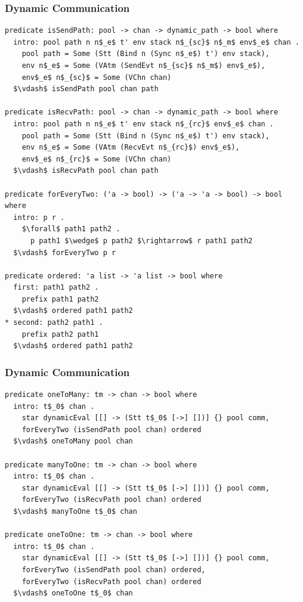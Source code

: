 \documentclass{beamer}
\begin{document}
\begin{frame}[fragile]
	\frametitle{Dynamic Communication}
\begin{lstlisting}[language=logic, mathescape]
predicate isSendPath: pool -> chan -> dynamic_path -> bool where
  intro: pool path n n$_e$ t' env stack n$_{sc}$ n$_m$ env$_e$ chan .
    pool path = Some (Stt (Bind n (Sync n$_e$) t') env stack),
    env n$_e$ = Some (VAtm (SendEvt n$_{sc}$ n$_m$) env$_e$), 
    env$_e$ n$_{sc}$ = Some (VChn chan)
  $\vdash$ isSendPath pool chan path

predicate isRecvPath: pool -> chan -> dynamic_path -> bool where
  intro: pool path n n$_e$ t' env stack n$_{rc}$ env$_e$ chan .
    pool path = Some (Stt (Bind n (Sync n$_e$) t') env stack),
    env n$_e$ = Some (VAtm (RecvEvt n$_{rc}$) env$_e$),
    env$_e$ n$_{rc}$ = Some (VChn chan)
  $\vdash$ isRecvPath pool chan path

predicate forEveryTwo: ('a -> bool) -> ('a -> 'a -> bool) -> bool where
  intro: p r .
    $\forall$ path1 path2 .
      p path1 $\wedge$ p path2 $\rightarrow$ r path1 path2
  $\vdash$ forEveryTwo p r

predicate ordered: 'a list -> 'a list -> bool where
  first: path1 path2 .
    prefix path1 path2
  $\vdash$ ordered path1 path2
* second: path2 path1 .
    prefix path2 path1
  $\vdash$ ordered path1 path2
\end{lstlisting}
\end{frame}

\begin{frame}[fragile]
	\frametitle{Dynamic Communication}
\begin{lstlisting}[language=logic, mathescape]
predicate oneToMany: tm -> chan -> bool where
  intro: t$_0$ chan .
    star dynamicEval [[] -> (Stt t$_0$ [->] [])] {} pool comm,
    forEveryTwo (isSendPath pool chan) ordered
  $\vdash$ oneToMany pool chan

predicate manyToOne: tm -> chan -> bool where
  intro: t$_0$ chan .
    star dynamicEval [[] -> (Stt t$_0$ [->] [])] {} pool comm,
    forEveryTwo (isRecvPath pool chan) ordered
  $\vdash$ manyToOne t$_0$ chan

predicate oneToOne: tm -> chan -> bool where
  intro: t$_0$ chan .
    star dynamicEval [[] -> (Stt t$_0$ [->] [])] {} pool comm,
    forEveryTwo (isSendPath pool chan) ordered,
    forEveryTwo (isRecvPath pool chan) ordered
  $\vdash$ oneToOne t$_0$ chan

\end{lstlisting}
\end{frame}
\end{document}
